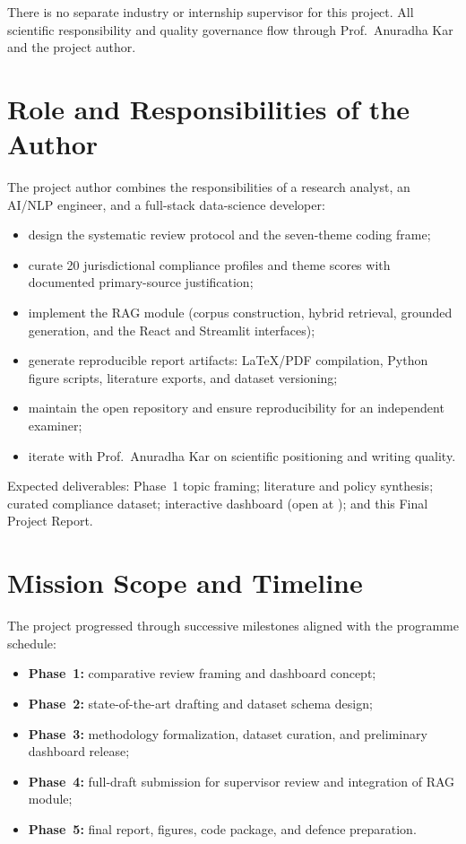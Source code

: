 There is no separate industry or internship supervisor for this project. All
scientific responsibility and quality governance flow through Prof.\ Anuradha Kar
and the project author.

\section{Role and Responsibilities of the Author}
\label{sec:role}

The project author combines the responsibilities of a research analyst, an AI/NLP
engineer, and a full-stack data-science developer:

\begin{itemize}[noitemsep]
  \item design the systematic review protocol and the seven-theme coding frame;
  \item curate 20 jurisdictional compliance profiles and theme scores with
        documented primary-source justification;
  \item implement the RAG module (corpus construction, hybrid retrieval, grounded
        generation, and the React and Streamlit interfaces);
  \item generate reproducible report artifacts: \LaTeX/PDF compilation, Python figure
        scripts, literature exports, and dataset versioning;
  \item maintain the open repository and ensure reproducibility for an independent
        examiner;
  \item iterate with Prof.\ Anuradha Kar on scientific positioning and writing quality.
\end{itemize}

Expected deliverables: Phase~1 topic framing; literature and policy synthesis; curated
compliance dataset; interactive dashboard (open at \repoLink{}); and this Final
Project Report.

\section{Mission Scope and Timeline}
\label{sec:mission}

The project progressed through successive milestones aligned with the programme
schedule:

\begin{itemize}[noitemsep]
  \item \textbf{Phase~1:} comparative review framing and dashboard concept;
  \item \textbf{Phase~2:} state-of-the-art drafting and dataset schema design;
  \item \textbf{Phase~3:} methodology formalization, dataset curation, and
        preliminary dashboard release;
  \item \textbf{Phase~4:} full-draft submission for supervisor review and
        integration of RAG module;
  \item \textbf{Phase~5:} final report, figures, code package, and defence
        preparation.
\end{itemize}

